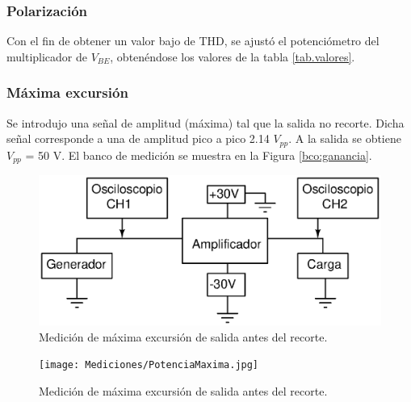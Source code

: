 		\subsubsection{Polarización}
			Con el fin de obtener un valor bajo de THD, se ajustó el potenciómetro del multiplicador de $V_{BE}$, obtenéndose los valores de la tabla \ref{tab.valores}.

		\subsubsection{Máxima excursión}
		Se introdujo una señal de amplitud (máxima) tal que la salida no recorte. Dicha señal corresponde a una
		de amplitud pico a pico 2.14 $V_{pp}$. A la salida se obtiene $V_{pp}$ = 50 V. El banco de medición se muestra en la Figura \ref{bco:ganancia}.

		\begin{figure}[h!]
			\centering
			\includegraphics[scale=0.5]{Figuras/bco_ganancia.eps}
			\caption{Medición de máxima excursión de salida antes del recorte.}
			\label{fig:bco_ganancia}
		\end{figure}

		\begin{figure}[h!]
			\centering
			\texttt{[image: Mediciones/PotenciaMaxima.jpg]}
			\caption{Medición de máxima excursión de salida antes del recorte.}
			\label{fig:MaxExcur}
		\end{figure}

